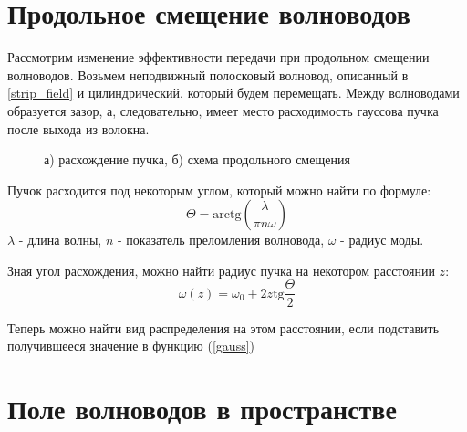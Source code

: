 \section{Продольное смещение волноводов}
Рассмотрим изменение эффективности передачи при продольном смещении волноводов. Возьмем неподвижный полосковый волновод, описанный в \ref{strip_field} и цилиндрический, который будем перемещать. Между волноводами образуется зазор, а, следовательно, имеет место расходимость гауссова пучка после выхода из волокна.
\begin{figure}[h!]
	\begin{minipage}[h]{0.49\linewidth}
	\end{minipage}
	\hfill
	\begin{minipage}[h]{0.49\linewidth}
	\end{minipage}
	\caption{а) расхождение пучка, б) схема продольного смещения}
\end{figure}

Пучок расходится под некоторым углом, который можно найти по формуле\cite{okamoto}:
\begin{equation}
	\Theta = \mathrm{arctg}(\frac{\lambda}{\pi n \omega})
\end{equation}
$\lambda$ - длина волны, $n$ - показатель преломления волновода, $\omega$ - радиус моды.

Зная угол расхождения, можно найти радиус пучка на некотором расстоянии $z$:
\begin{equation}
	\omega(z) = \omega_0 + 2z \mathrm{tg} \frac{\Theta}{2}
\end{equation}

Теперь можно найти вид распределения на этом расстоянии, если подставить получившееся значение в функцию (\ref{gauss})

\section{Поле волноводов в пространстве}


